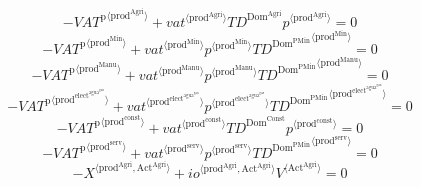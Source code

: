 \begin{equation}
-{{V\!A\!T}^{\mathrm{p}}}^{\langle \mathrm{prod}^{\mathrm{Agri}}\rangle} + {{{v\!a\!t}}^{\langle \mathrm{\mathrm{prod}^{\mathrm{Agri}}}\rangle}} {{T\!D}^{\mathrm{Dom}^{\mathrm{Agri}}}} {{p}^{\langle \mathrm{prod}^{\mathrm{Agri}}\rangle}} = 0
\end{equation}
\begin{equation}
-{{V\!A\!T}^{\mathrm{p}}}^{\langle \mathrm{prod}^{\mathrm{Min}}\rangle} + {{{v\!a\!t}}^{\langle \mathrm{\mathrm{prod}^{\mathrm{Min}}}\rangle}} {{p}^{\langle \mathrm{prod}^{\mathrm{Min}}\rangle}} {{{T\!D}^{\mathrm{Dom}^{\mathrm{PMin}}}}^{\langle \mathrm{prod}^{\mathrm{Min}}\rangle}} = 0
\end{equation}
\begin{equation}
-{{V\!A\!T}^{\mathrm{p}}}^{\langle \mathrm{prod}^{\mathrm{Manu}}\rangle} + {{{v\!a\!t}}^{\langle \mathrm{\mathrm{prod}^{\mathrm{Manu}}}\rangle}} {{p}^{\langle \mathrm{prod}^{\mathrm{Manu}}\rangle}} {{{T\!D}^{\mathrm{Dom}^{\mathrm{PMin}}}}^{\langle \mathrm{prod}^{\mathrm{Manu}}\rangle}} = 0
\end{equation}
\begin{equation}
-{{V\!A\!T}^{\mathrm{p}}}^{\langle \mathrm{prod}^{\mathrm{elect}^{\mathrm{agua}^{\mathrm{gas}}}}\rangle} + {{{v\!a\!t}}^{\langle \mathrm{\mathrm{prod}^{\mathrm{elect}^{\mathrm{agua}^{\mathrm{gas}}}}}\rangle}} {{p}^{\langle \mathrm{prod}^{\mathrm{elect}^{\mathrm{agua}^{\mathrm{gas}}}}\rangle}} {{{T\!D}^{\mathrm{Dom}^{\mathrm{PMin}}}}^{\langle \mathrm{prod}^{\mathrm{elect}^{\mathrm{agua}^{\mathrm{gas}}}}\rangle}} = 0
\end{equation}
\begin{equation}
-{{V\!A\!T}^{\mathrm{p}}}^{\langle \mathrm{prod}^{\mathrm{const}}\rangle} + {{{v\!a\!t}}^{\langle \mathrm{\mathrm{prod}^{\mathrm{const}}}\rangle}} {{T\!D}^{\mathrm{Dom}^{\mathrm{Const}}}} {{p}^{\langle \mathrm{prod}^{\mathrm{const}}\rangle}} = 0
\end{equation}
\begin{equation}
-{{V\!A\!T}^{\mathrm{p}}}^{\langle \mathrm{prod}^{\mathrm{serv}}\rangle} + {{{v\!a\!t}}^{\langle \mathrm{\mathrm{prod}^{\mathrm{serv}}}\rangle}} {{p}^{\langle \mathrm{prod}^{\mathrm{serv}}\rangle}} {{{T\!D}^{\mathrm{Dom}^{\mathrm{PMin}}}}^{\langle \mathrm{prod}^{\mathrm{serv}}\rangle}} = 0
\end{equation}
\begin{equation}
-{X}^{\langle \mathrm{prod}^{\mathrm{Agri}},\mathrm{Act}^{\mathrm{Agri}}\rangle} + {{{i\!o}}^{\langle \mathrm{\mathrm{prod}^{\mathrm{Agri}}},\mathrm{\mathrm{Act}^{\mathrm{Agri}}}\rangle}} {{V}^{\langle \mathrm{Act}^{\mathrm{Agri}}\rangle}} = 0
\end{equation}

